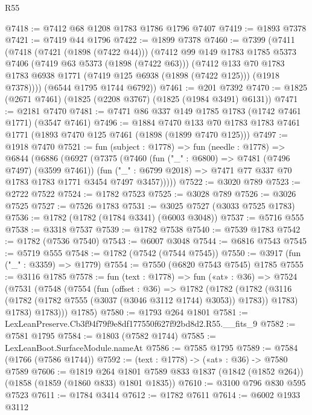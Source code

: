\begin{lexlean}{R55}
\begin{coremodule}
@7418 := @7412 @68 @1208 @1783 @1786 @1796 @7407
@7419 := @1893 @7378
@7421 := @7419 @44 @1796
@7422 := @1899 @7378
@7460 := @7399
    (@7411
      (@7418
        (@7421 (@1898 (@7422 @44)))
        (@7412
          @99
          @149
          @1783
          @1785
          @5373
          @7406
          (@7419 @63 @5373 (@1898 (@7422 @63)))
          (@7412
            @133
            @70
            @1783
            @1783
            @6938
            @1771
            (@7419 @125 @6938 (@1898 (@7422 @125)))
            (@1918 @7378))))
      (@6544 @1795 @1744 @6792))
@7461 := @201 @7392
@7470 := @1825 (@2671 @7461) (@1825 (@2208 @3767) (@1825 (@1984 @3491) @6131))
@7471 := @2181 @7470
@7481 := @7471 @86 @337 @149 @1785 @1783 (@1742 @7461 @1771) (@3547 @7461)
@7496 := @1884
    @7470
    @133
    @70
    @1783
    @1783
    @7461
    @1771
    (@1893 @7470 @125 @7461 (@1898 (@1899 @7470 @125)))
@7497 := @1918 @7470
@7521 := fun (subject : @1778) =>
  fun (needle : @1778) =>
  @6844
    (@6886
      (@6927
        (@7375
          (@7460
            (fun ("_" : @6800) => @7481 (@7496 @7497) (@3599 @7461))
            (fun ("_" : @6799 @2018) => @7471 @77 @337 @70 @1783 @1783 @1771 @3454 @7497 @3457)))))
@7522 := @3020 @789
@7523 := @2722 @7522
@7524 := @1782 @7523
@7525 := @3028 @789
@7526 := @3026 @7525
@7527 := @7526 @1783
@7531 := @3025 @7527 (@3033 @7525 @1783)
@7536 := @1782 (@1782 (@1784 @3341) (@6003 @3048))
@7537 := @5716 @555
@7538 := @3318 @7537
@7539 := @1782 @7538
@7540 := @7539 @1783
@7542 := @1782 (@7536 @7540)
@7543 := @6007 @3048
@7544 := @6816 @7543
@7545 := @5719 @555
@7548 := @1782 (@7542 (@7544 @7545))
@7550 := @3917 (fun ("_" : @3359) => @1779)
@7554 := @7550 (@6820 @7543 @7545) @1785
@7555 := @3116 @1785
@7578 := fun (text : @1778) =>
  fun («at» : @36) =>
  @7524
    (@7531
      (@7548
        (@7554
          (fun (offset : @36) =>
          @1782
            (@1782
              (@1782 (@3116 (@1782 (@1782 @7555 (@3037 (@3046 @3112 @1744) @3053)) @1783)) @1783)
              @1783)
            @1783)))
      @1785)
@7580 := @1793 @264 @1801
@7581 := LexLeanPreserve.Cb3f94f79f9e8df177550f627f92bd8d2.R55.__fits_9
@7582 := @7581 @1795
@7584 := @1803 (@7582 @1744)
@7585 := LexLeanBoot.SurfaceModule.nameAt
@7586 := @7585 @1795
@7589 := @7584 (@1766 (@7586 @1744))
@7592 := (text : @1778) -> («at» : @36) -> @7580 @7589
@7606 := @1819
    @264
    @1801
    @7589
    @833
    @1837
    (@1842 (@1852 @264))
    (@1858 (@1859 (@1860 @833) @1801 @1835))
@7610 := @3100 @796 @830 @595 @7523
@7611 := @1784 @3414
@7612 := @1782 @7611
@7614 := @6002 @1933 @3112

\end{coremodule}
\end{lexlean}
